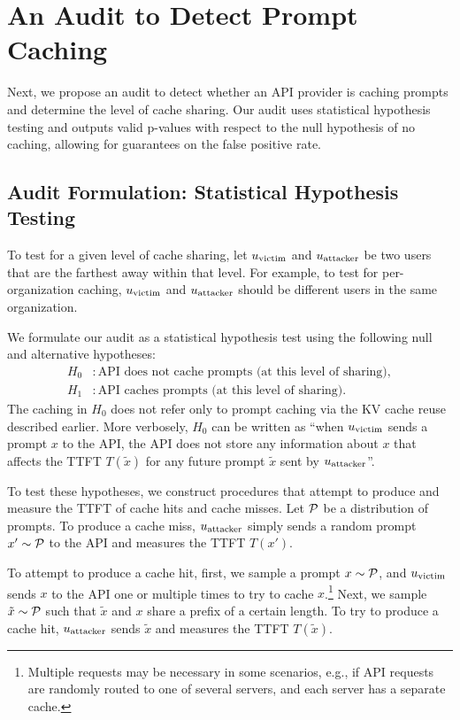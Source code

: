 \section{An Audit to Detect Prompt Caching}

Next, we propose an audit to detect whether an API provider is caching prompts and determine the level of cache sharing. Our audit uses statistical hypothesis testing and outputs valid p-values with respect to the null hypothesis of no caching, allowing for guarantees on the false positive rate.


\subsection{Audit Formulation: Statistical Hypothesis Testing}

To test for a given level of cache sharing, let $u_\text{victim}$ and $u_\text{attacker}$ be two users that are the farthest away within that level. For example, to test for per-organization caching, $u_\text{victim}$ and $u_\text{attacker}$ should be different users in the same organization.


We formulate our audit as a statistical hypothesis test using the following null and alternative hypotheses:
\begin{align*}
    H_0 &: \text{API does not cache prompts (at this level of sharing)}, \\
    H_1 &: \text{API caches prompts (at this level of sharing)}.
\end{align*}
The caching in $H_0$ does not refer only to prompt caching via the KV cache reuse described earlier. More verbosely, $H_0$ can be written as ``when $u_\text{victim}$ sends a prompt $x$ to the API, the API does not store any information about $x$ that affects the TTFT $T(\tilde{x})$ for any future prompt $\tilde{x}$ sent by $u_\text{attacker}$''.


To test these hypotheses, we construct procedures that attempt to produce and measure the TTFT of cache hits and cache misses. Let $\mathcal{P}$ be a distribution of prompts. To produce a cache miss, $u_\text{attacker}$ simply sends a random prompt $x' \sim \mathcal{P}$ to the API and measures the TTFT $T(x')$.

To attempt to produce a cache hit, first, we sample a prompt $x \sim \mathcal{P}$, and $u_\text{victim}$ sends $x$ to the API one or multiple times to try to cache $x$.\footnote{Multiple requests may be necessary in some scenarios, e.g., if API requests are randomly routed to one of several servers, and each server has a separate cache.} Next, we sample $\tilde{x} \sim \mathcal{P}$ such that $\tilde{x}$ and $x$ share a prefix of a certain length. To try to produce a cache hit, $u_\text{attacker}$ sends $\tilde{x}$ and measures the TTFT $T(\tilde{x})$.




